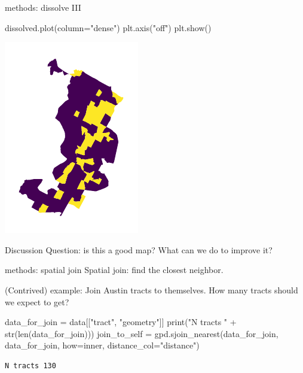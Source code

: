 \documentclass[
  ignorenonframetext,
]{beamer}
\newenvironment{Shaded}{\begin{snugshade}}{\end{snugshade}}
\newcommand{\BuiltInTok}[1]{\textcolor[rgb]{0.00,0.23,0.31}{#1}}
\newcommand{\NormalTok}[1]{\textcolor[rgb]{0.00,0.23,0.31}{#1}}
\newcommand{\OperatorTok}[1]{\textcolor[rgb]{0.37,0.37,0.37}{#1}}
\newcommand{\StringTok}[1]{\textcolor[rgb]{0.13,0.47,0.30}{#1}}
\begin{document}
\begin{frame}[fragile]{methods: dissolve III}
\label{methods-dissolve-iii}
\begin{Shaded}
\begin{Highlighting}[]
\NormalTok{dissolved.plot(column}\OperatorTok{=}\StringTok{"dense"}\NormalTok{)}
\NormalTok{plt.axis(}\StringTok{"off"}\NormalTok{)}
\NormalTok{plt.show()}
\end{Highlighting}
\end{Shaded}

\includegraphics{spatial_2_files/figure-beamer/cell-26-output-1.pdf}

Discussion Question: is this a good map? What can we do to improve it?
\end{frame}

\begin{frame}[fragile]{methods: spatial join}
\label{methods-spatial-join}
Spatial join: find the closest neighbor.

(Contrived) example: Join Austin tracts to themselves. How many tracts
should we expect to get?

\begin{Shaded}
\begin{Highlighting}[]
\NormalTok{data\_for\_join }\OperatorTok{=}\NormalTok{ data[[}\StringTok{"tract"}\NormalTok{, }\StringTok{"geometry"}\NormalTok{]]}
\BuiltInTok{print}\NormalTok{(}\StringTok{"N tracts "} \OperatorTok{+} \BuiltInTok{str}\NormalTok{(}\BuiltInTok{len}\NormalTok{(data\_for\_join)))}
\NormalTok{join\_to\_self }\OperatorTok{=}\NormalTok{ gpd.sjoin\_nearest(data\_for\_join, data\_for\_join, how}\OperatorTok{=}\StringTok{\textquotesingle{}inner\textquotesingle{}}\NormalTok{, distance\_col}\OperatorTok{=}\StringTok{"distance"}\NormalTok{)}
\end{Highlighting}
\end{Shaded}

\begin{verbatim}
N tracts 130
\end{verbatim}
\end{frame}
\end{document}
